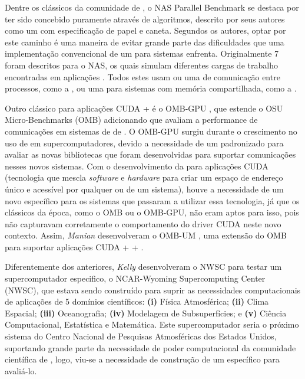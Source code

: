 Dentre os \benchs clássicos da comunidade de \HPC, o NAS Parallel Benchmark \cite{baileynasbench} se destaca por ter sido concebido puramente através de algoritmos, descrito por seus autores como um \bench com especificação de papel e caneta. Segundos os autores, optar por este caminho é uma maneira de evitar grande parte das dificuldades que uma implementação convencional de um \bench para sistemas \HPC enfrenta. Originalmente 7  foram descritos para o NAS, os quais simulam diferentes cargas de trabalho encontradas em aplicações \HPC. Todos estes  usam ou uma \API de comunicação entre processos, como a \MPI, ou uma \API para sistemas com memória compartilhada, como a \OpenMP.

Outro \bench clássico para aplicações CUDA + \MPI é o OMB-GPU \cite{bureddyomb}, que estende o OSU Micro-Benchmarks (OMB) adicionando  que avaliam a performance de comunicações \MPI em sistemas de \clusters de \GPUs. O OMB-GPU surgiu durante o crescimento no uso de \GPUs em supercomputadores, devido a necessidade de um \bench padronizado para avaliar as novas bibliotecas \MPI que foram desenvolvidas para suportar comunicações \MPI nesses novos sistemas. Com o desenvolvimento da \UM para aplicações CUDA (tecnologia que mescla \textit{software} e \textit{hardware} para criar um espaço de endereço único e acessível por qualquer \GPU ou \CPU de um sistema), houve a necessidade de um novo \bench específico para os sistemas que passaram a utilizar essa tecnologia, já que os \benchs clássicos da época, como o OMB ou o OMB-GPU, não eram aptos para isso, pois não capturavam corretamente o comportamento do driver CUDA neste novo contexto. Assim, \textit{Manian} \etal desenvolveram o OMB-UM \cite{maniancudaum}, uma extensão do OMB para suportar aplicações CUDA + \MPI + \UM.

Diferentemente dos \benchs anteriores, \textit{Kelly} \etal \cite{kellynwsc} desenvolveram o \bench NWSC para testar um supercomputador especifico, o NCAR-Wyoming Supercomputing Center (NWSC), que estava sendo construído para suprir as necessidades computacionais de aplicações \HPC de 5 domínios científicos: \textbf{(i)} Física Atmosférica; \textbf{(ii)} Clima Espacial; \textbf{(iii)} Oceanografia; \textbf{(iv)} Modelagem de Subsuperfícies; e \textbf{(v)} Ciência Computacional, Estatística e Matemática. Este supercomputador seria o próximo sistema \HPC do Centro Nacional de Pesquisas Atmosféricas dos Estados Unidos, suportando grande parte da necessidade de poder computacional da comunidade científica de \HPC, logo, viu-se a necessidade de construção de um \bench específico para avaliá-lo.

